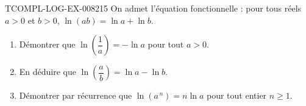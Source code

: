 \begin{exercice}{TCOMPL-LOG-EX-008}{2}{15}
On admet l'équation fonctionnelle : pour tous réels $a>0$ et $b>0$,
$\ln(ab)=\ln a+\ln b$.
\begin{enumerate}
  \item Démontrer que $\ln\!\left(\dfrac{1}{a}\right)=-\ln a$ pour tout
        $a>0$.
  \item En déduire que $\ln\!\left(\dfrac{a}{b}\right)=\ln a-\ln b$.
  \item Démontrer par récurrence que $\ln(a^{\,n})=n\ln a$ pour tout entier
        $n\geq1$.
\end{enumerate}
\end{exercice}
